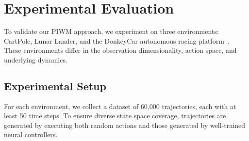 \documentclass[nonacm,sigconf]{acmart}
\begin{document}





\section{Experimental Evaluation}\label{sec:experiments}
To validate our PIWM approach, we experiment on three environments: CartPole, Lunar Lander, and the DonkeyCar autonomous racing platform~\cite[]{brockman2016openai,viitala2021learning}. These environments differ in the observation dimensionality, action space, and underlying dynamics.


\subsection{Experimental Setup}\label{sec:setup}

For each environment, we collect a dataset of 60,000 trajectories, each with at least 50 time steps. To ensure diverse state space coverage, trajectories are generated by executing both random actions and those generated by well-trained neural controllers. 
\end{document}
